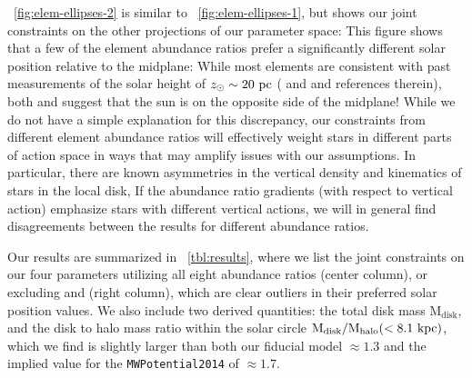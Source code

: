 \documentclass[modern]{aastex63}
\newcommand{\mdisk}{\ensuremath{\mathrm{M}_\mathrm{disk}}}
\newcommand{\mratio}{\ensuremath{\mdisk / \mdisk^\star}}
\newcommand{\hz}{\ensuremath{h_{z, \odot}}}
\newcommand{\zsun}{\ensuremath{z_\odot}}
\newcommand{\vzsun}{\ensuremath{v_{z, \odot}}}
\begin{document}
\figurename~\ref{fig:elem-ellipses-2} is similar to
\figurename~\ref{fig:elem-ellipses-1}, but shows our joint constraints on the
other projections of our parameter space:
This figure shows that a few of the element abundance ratios prefer a
significantly different solar position relative to the midplane:
While most elements are consistent with past measurements of the solar height of
$z_\odot \sim 20~\mathrm{pc}$ (\citealt{Bennett:2019} and \citealt{Bland-Hawthorn:2016}
and references therein), both  and  suggest
that the sun is on the opposite side of the midplane!
While we do not have a simple explanation for this discrepancy, our constraints
from different element abundance ratios will effectively weight stars in
different parts of action space in ways that may amplify issues with our
assumptions.
In particular, there are known asymmetries in the vertical density and
kinematics of stars in the local disk, 
If the abundance ratio gradients (with respect to vertical action) emphasize
stars with different vertical actions, we will in general find disagreements
between the results for different abundance ratios.

Our results are summarized in \tablename~\ref{tbl:results}, where we list the
joint constraints on our four parameters utilizing all eight abundance ratios
(center column), or excluding  and  (right
column), which are clear outliers in their preferred solar position values.
We also include two derived quantities: the total disk mass $\mdisk$, and the
disk to halo mass ratio within the solar circle ${\rm M}_{\rm disk} / {\rm
M}_{\rm halo} (<8.1~\mathrm{kpc})$, which we find is slightly larger than both  our
fiducial model $\approx 1.3$ \citep{gala} and the implied value for the
\texttt{MWPotential2014} \citep{Bovy:2015} of $\approx 1.7$.

\end{document}
